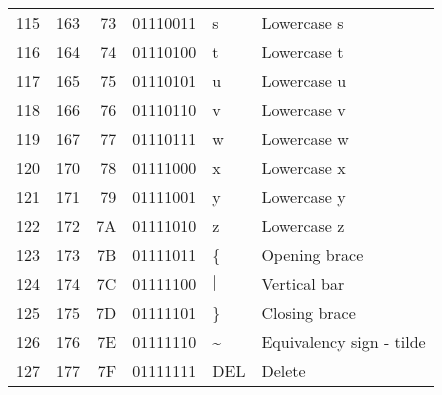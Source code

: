 \documentclass[11pt]{article}
\begin{document}
\begin{longtable}{rrrrll}
115 & 163 & 73 & 01110011 & s & Lowercase s\\
116 & 164 & 74 & 01110100 & t & Lowercase t\\
117 & 165 & 75 & 01110101 & u & Lowercase u\\
118 & 166 & 76 & 01110110 & v & Lowercase v\\
119 & 167 & 77 & 01110111 & w & Lowercase w\\
120 & 170 & 78 & 01111000 & x & Lowercase x\\
121 & 171 & 79 & 01111001 & y & Lowercase y\\
122 & 172 & 7A & 01111010 & z & Lowercase z\\
123 & 173 & 7B & 01111011 & \{ & Opening brace\\
124 & 174 & 7C & 01111100 & \(\vert{}\) & Vertical bar\\
125 & 175 & 7D & 01111101 & \} & Closing brace\\
126 & 176 & 7E & 01111110 & \textasciitilde{} & Equivalency sign - tilde\\
127 & 177 & 7F & 01111111 & DEL & Delete\\
\end{longtable}
\end{document}
